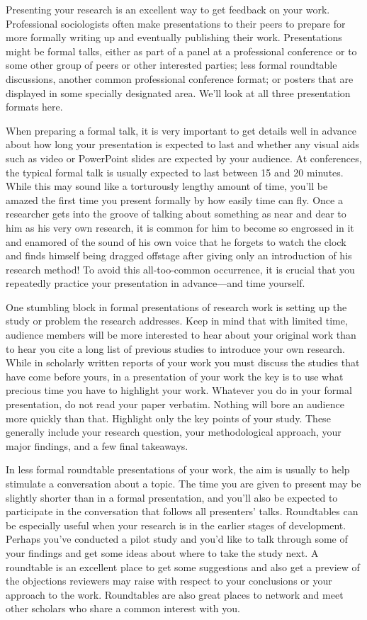Presenting your research is an excellent way to get feedback on your work. Professional sociologists often make presentations to their peers to prepare for more formally writing up and eventually publishing their work. Presentations might be formal talks, either as part of a panel at a professional conference or to some other group of peers or other interested parties; less formal roundtable discussions, another common professional conference format; or posters that are displayed in some specially designated area. We’ll look at all three presentation formats here.

When preparing a formal talk, it is very important to get details well in advance about how long your presentation is expected to last and whether any visual aids such as video or PowerPoint slides are expected by your audience. At conferences, the typical formal talk is usually expected to last between 15 and 20 minutes. While this may sound like a torturously lengthy amount of time, you’ll be amazed the first time you present formally by how easily time can fly. Once a researcher gets into the groove of talking about something as near and dear to him as his very own research, it is common for him to become so engrossed in it and enamored of the sound of his own voice that he forgets to watch the clock and finds himself being dragged offstage after giving only an introduction of his research method! To avoid this all-too-common occurrence, it is crucial that you repeatedly practice your presentation in advance—and time yourself.

One stumbling block in formal presentations of research work is setting up the study or problem the research addresses. Keep in mind that with limited time, audience members will be more interested to hear about your original work than to hear you cite a long list of previous studies to introduce your own research. While in scholarly written reports of your work you must discuss the studies that have come before yours, in a presentation of your work the key is to use what precious time you have to highlight your work. Whatever you do in your formal presentation, do not read your paper verbatim. Nothing will bore an audience more quickly than that. Highlight only the key points of your study. These generally include your research question, your methodological approach, your major findings, and a few final takeaways.

In less formal roundtable presentations of your work, the aim is usually to help stimulate a conversation about a topic. The time you are given to present may be slightly shorter than in a formal presentation, and you’ll also be expected to participate in the conversation that follows all presenters’ talks. Roundtables can be especially useful when your research is in the earlier stages of development. Perhaps you’ve conducted a pilot study and you’d like to talk through some of your findings and get some ideas about where to take the study next. A roundtable is an excellent place to get some suggestions and also get a preview of the objections reviewers may raise with respect to your conclusions or your approach to the work. Roundtables are also great places to network and meet other scholars who share a common interest with you.


